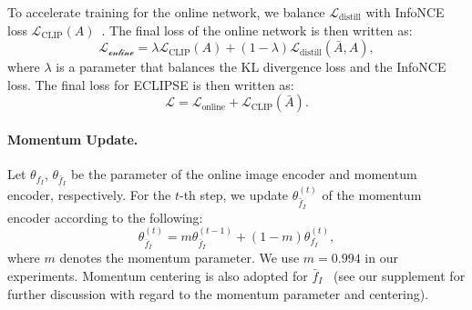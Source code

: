 To accelerate training for the online network, we balance $\mathcal{L}_{\text{distill}}$ with InfoNCE loss $\mathcal{L}_{\text{CLIP}}(A)$~\cite{touvron2021training}.
The final loss of the online network is then written as:
\begin{equation}
    \mathcal{L_{\text{online}}}=\lambda\mathcal{L}_{\text{CLIP}}(A)+(1-\lambda) \mathcal{L}_{\text{distill}}(\bar{A},A),
    \label{eq:distill}
\end{equation}
where $\lambda$ is a parameter that balances the KL divergence loss and the InfoNCE loss.
The final loss for ECLIPSE is then written as:
\begin{equation}
    \mathcal{L}=\mathcal{L}_{\text{online}}+\mathcal{L}_{\text{CLIP}}(\bar{A}).
\end{equation}

\paragraph{Momentum Update.}
Let $\theta_{f_I}$, $\theta_{\bar{f}_I}$ be the parameter of the online image encoder and momentum encoder, respectively.
For the $t$-th step, we update $\theta^{(t)}_{\bar{f}_I}$ of the momentum encoder according to the following:
\begin{equation}
    \theta_{\bar{f}_I}^{(t)} = m \theta_{\bar{f}_I}^{(t-1)} + (1-m) \theta_{f_I}^{(t)},
\end{equation}
where $m$ denotes the momentum parameter. We use $m=0.994$ in our experiments.
Momentum centering is also adopted for $\bar{f}_I$~\cite{caron2021emerging} (see our supplement for further discussion with regard to the momentum parameter and centering).